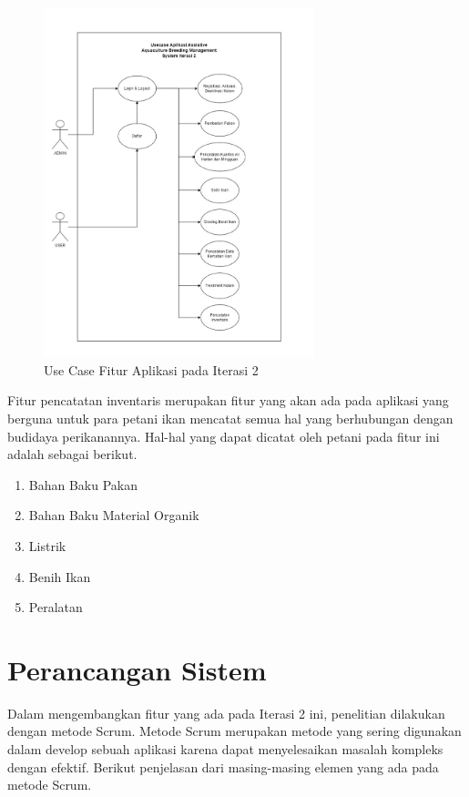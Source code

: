 \begin{figure}[H]
	\centering
	\includegraphics[width=0.7\textwidth]{gambar/akbar/usecase_iterasi_2.jpeg}
	\caption{Use Case Fitur Aplikasi pada Iterasi 2}
\end{figure}

Fitur pencatatan inventaris merupakan fitur yang akan ada pada aplikasi yang berguna untuk para petani ikan mencatat semua hal yang berhubungan dengan budidaya perikanannya. Hal-hal yang dapat dicatat oleh petani pada fitur ini adalah sebagai berikut.

\begin{enumerate}
	\item Bahan Baku Pakan
	\item Bahan Baku Material Organik
	\item Listrik
	\item Benih Ikan
	\item Peralatan
\end{enumerate}

\section{Perancangan Sistem}

Dalam mengembangkan fitur yang ada pada Iterasi 2 ini, penelitian dilakukan dengan metode Scrum. Metode Scrum merupakan metode yang sering digunakan dalam develop sebuah aplikasi karena dapat menyelesaikan masalah kompleks dengan efektif. Berikut penjelasan dari masing-masing elemen yang ada pada metode Scrum.

